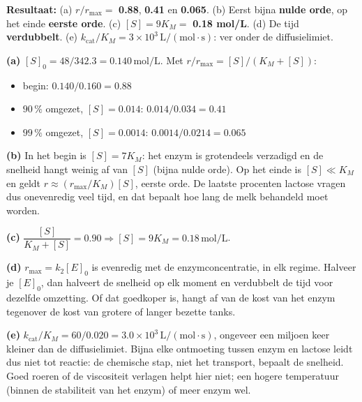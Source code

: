 \begin{oplossing}
\textbf{Resultaat:} (a) \(r/r_{\max} =\) \textbf{0.88}, \textbf{0.41} en \textbf{0.065}. (b) Eerst bijna \textbf{nulde orde}, op het einde \textbf{eerste orde}. (c) \([S] = 9K_M =\) \textbf{0.18 mol/L}. (d) De tijd \textbf{verdubbelt}. (e) \(k_{\text{cat}}/K_M = 3\times10^{3}\,\mathrm{L/(mol\cdot s)}\): ver onder de diffusielimiet.

\textbf{(a)} \([S]_0 = 48/342.3 = 0.140\,\mathrm{mol/L}\). Met \(r/r_{\max} = [S]/(K_M + [S])\):

\begin{itemize}
\item
  begin: \(0.140/0.160 = 0.88\)
\item
  \(90\,\%\) omgezet, \([S] = 0.014\): \(0.014/0.034 = 0.41\)
\item
  \(99\,\%\) omgezet, \([S] = 0.0014\): \(0.0014/0.0214 = 0.065\)
\end{itemize}

\textbf{(b)} In het begin is \([S] = 7K_M\): het enzym is grotendeels verzadigd en de snelheid hangt weinig af van \([S]\) (bijna nulde orde). Op het einde is \([S] \ll K_M\) en geldt \(r \approx (r_{\max}/K_M)[S]\), eerste orde. De laatste procenten lactose vragen dus onevenredig veel tijd, en dat bepaalt hoe lang de melk behandeld moet worden.

\textbf{(c)} \(\dfrac{[S]}{K_M + [S]} = 0.90 \Rightarrow [S] = 9K_M = 0.18\,\mathrm{mol/L}\).

\textbf{(d)} \(r_{\max} = k_2[E]_0\) is evenredig met de enzymconcentratie, in elk regime. Halveer je \([E]_0\), dan halveert de snelheid op elk moment en verdubbelt de tijd voor dezelfde omzetting. Of dat goedkoper is, hangt af van de kost van het enzym tegenover de kost van grotere of langer bezette tanks.

\textbf{(e)} \(k_{\text{cat}}/K_M = 60/0.020 = 3.0\times10^{3}\,\mathrm{L/(mol\cdot s)}\), ongeveer een miljoen keer kleiner dan de diffusielimiet. Bijna elke ontmoeting tussen enzym en lactose leidt dus niet tot reactie: de chemische stap, niet het transport, bepaalt de snelheid. Goed roeren of de viscositeit verlagen helpt hier niet; een hogere temperatuur (binnen de stabiliteit van het enzym) of meer enzym wel.
\end{oplossing}

